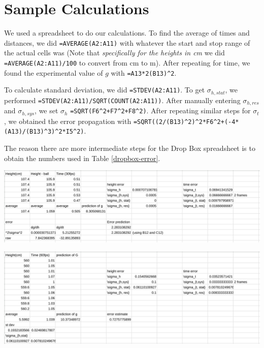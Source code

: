 \documentclass[12pt]{article}
\begin{document}
\section{Sample Calculations}
\label{sec:org8752076}

We used a spreadsheet to do our calculations. To find the average of times and distances, we did \texttt{=AVERAGE(A2:A11)} with whatever the start and stop range of the actual cells was (Note that \emph{specifically for the heights in cm} we did \texttt{=AVERAGE(A2:A11)/100} to convert from cm to m). After repeating for time, we found the experimental value of \(g\) with \texttt{=A13*2(B13)\textasciicircum{}2}.

To calculate standard deviation, we did \texttt{=STDEV(A2:A11)}. To get \(\sigma_{h,stat}\), we performed \texttt{=STDEV(A2:A11)/SQRT(COUNT(A2:A11))}. After manually entering \(\sigma_{h,res}\) and \(\sigma_{h,sys}\), we set \(\sigma_{h}\) \texttt{=SQRT(F6\textasciicircum{}2+F7\textasciicircum{}2+F8\textasciicircum{}2)}. After repeating similar steps for \(\sigma_t\), we obtained the error propagation with \texttt{=SQRT((2/(B13)\textasciicircum{}2)\textasciicircum{}2*F6\textasciicircum{}2+(-4*(A13)/(B13)\textasciicircum{}3)\textasciicircum{}2*I5\textasciicircum{}2)}.

The reason there are more intermediate steps for the Drop Box spreadsheet is to obtain the numbers used in Table \ref{dropbox-error}.

\begin{center}
\includegraphics[width=6in]{./dropboxspreadsheet.png}
\end{center}

\begin{center}
\includegraphics[width=6in]{./tennisballspreadsheet.png}
\end{center}
\end{document}
